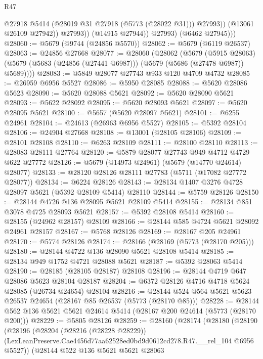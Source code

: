 \begin{lexlean}{R47}
\begin{coremodule}
                      @27918
                      @5414
                      (@28019 @31 @27918 (@5773 (@28022 @31)))
                      @27993))
                  (@13061 @26109 @27942))
                @27993))
            (@14915 @27944))
          @27993)
        (@6462 @27945)))
@28060 := @5679 (@9744 (@24856 @5570))
@28062 := @5679 (@6119 @26537)
@28063 := @24856 @27668
@28077 := @28060
    (@28062
      (@5679
        (@5915 @28063)
        (@5679 (@5683 (@24856 (@27441 @6987))) (@5679 (@5686 (@27478 @6987)) @5689))))
@28083 := @5849 @28077 @27743 @933 @120 @4709 @4732
@28085 := @26959 @6956 @5527
@28086 := @5950 @28085
@28088 := @5620 @28086 @5623
@28090 := @5620 @28088 @5621
@28092 := @5620 @28090 @5621
@28093 := @5622 @28092
@28095 := @5620 @28093 @5621
@28097 := @5620 @28095 @5621
@28100 := @5657 (@5620 @28097 @5621)
@28101 := @6255 @24961
@28104 := @24613 (@26963 @6956 @5527)
@28105 := @5392 @28104
@28106 := @24904 @27668
@28108 := @13001 (@28105 @28106)
@28109 := @28101 @28108
@28110 := @6263 @28109
@28111 := @28100 @28110
@28113 := @28083 @28111 @27764
@28120 := @5879 @28077 @27743 @949 @4712 @4729 @622 @27772
@28126 := @5679 (@14973 @24961) (@5679 (@14770 @24614) @28077)
@28133 := @28120 @28126 @28111 @27783 (@5711 (@17082 @27772 @28077))
@28134 := @6224 @28126
@28143 := @28134 @1407 @3276 @4728 @28097 @5621 (@5392 @28109 @5414) @28110
@28144 := @5759 @28126
@28150 := @28144 @4726 @136 @28095 @5621 @28109 @5414
@28155 := @28134 @851 @3078 @4725 @28093 @5621
@28157 := @5392 @28108 @5414
@28160 := @28155 (@24962 @28157) @28109
@28166 := @28144 @585 @4724 @5621 @28092 @24961 @28157
@28167 := @5768 @28126
@28169 := @28167 @205 @24961
@28170 := @5774 @28126
@28174 := @28166 (@28169 (@5773 (@28170 @205)))
@28180 := @28144 @4722 @136 @28090 @5621 @28108 @5414
@28185 := @28134 @949 @1752 @4721 @28088 @5621
@28187 := @5392 @28063 @5414
@28190 := @28185 (@28105 @28187) @28108
@28196 := @28144 @4719 @647 @28086 @5623 @28104 @28187
@28204 := @6372 @28126 @4716 @4718 @5624 @28085 (@26734 @24654) @28104
@28216 := @28144 @524 @564 @5621 @5623 @26537 @24654 (@28167 @85 @26537 (@5773 (@28170 @85)))
@28228 := @28144 @562 @136 @5621 @5621 @24614 @5414 (@28167 @200 @24614 (@5773 (@28170 @200)))
@28229 := @5805 @28126
@28259 := @28160
    (@28174
      (@28180
        (@28190
          (@28196
            (@28204
              (@28216 (@28228 @28229))
              (LexLeanPreserve.Cae4456d77aa62528ed0bd9d0612cd278.R47.__rel_104 @6956 @5527))
            (@28144
              @522
              @136
              @5621
              @5621
              @28063

\end{coremodule}
\end{lexlean}
